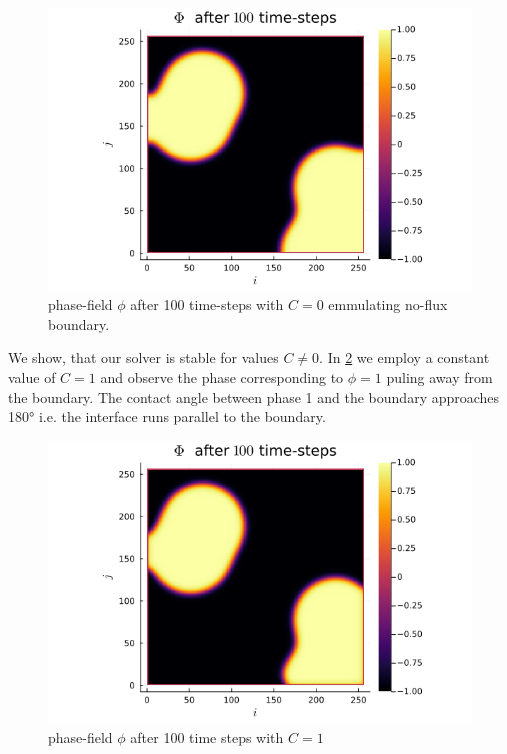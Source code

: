 \documentclass{mimosis}
\begin{document}
\begin{figure}[htbp]
\centering
\includegraphics[width=.9\linewidth]{images/baseline.png}
\caption{\label{fig:angle0}phase-field \(\phi\) after 100 time-steps with \(C=0\) emmulating no-flux boundary.}
\end{figure}

We show, that our solver is stable for values \(C \neq 0\). In \ref{fig:angle1} we employ a constant value of \(C=1\) and observe the phase corresponding to \(\phi = 1\) puling away from the boundary. The contact angle between phase 1 and the boundary approaches 180° i.e. the interface runs parallel to the boundary.
\begin{figure}[htbp]
\centering
\includegraphics[width=.9\linewidth]{images/angle1.png}
\caption{\label{fig:angle1}phase-field   \(\phi\) after 100 time steps with \(C=1\)}
\end{figure}
\end{document}

